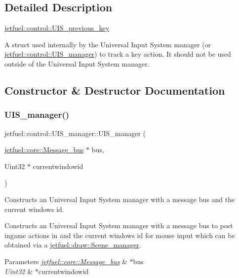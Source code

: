 \subsection{Detailed Description}
\hyperlink{structjetfuel_1_1control_1_1UIS__previous__key}{jetfuel\+::control\+::\+U\+I\+S\+\_\+previous\+\_\+key}

A struct used internally by the Universal Input System manager (or \hyperlink{classjetfuel_1_1control_1_1UIS__manager}{jetfuel\+::control\+::\+U\+I\+S\+\_\+manager}) to track a key action. It should not be used outside of the Universal Input System manager. 

\subsection{Constructor \& Destructor Documentation}
\mbox{\label{classjetfuel_1_1control_1_1UIS__manager_a04d1feda567af305a4495b189ef9bc8f}} 
\subsubsection{\texorpdfstring{U\+I\+S\+\_\+manager()}{UIS\_manager()}}
{\footnotesize\ttfamily jetfuel\+::control\+::\+U\+I\+S\+\_\+manager\+::\+U\+I\+S\+\_\+manager (\begin{DoxyParamCaption}\item[{\hyperlink{classjetfuel_1_1core_1_1Message__bus}{jetfuel\+::core\+::\+Message\+\_\+bus} $\ast$}]{bus,  }\item[{Uint32 $\ast$}]{currentwindowid }\end{DoxyParamCaption})}



Constructs an Universal Input System manager with a message bus and the current window\textquotesingle{}s id. 

Constructs an Universal Input System manager with a message bus to post ingame actions in and the current window\textquotesingle{}s id for mouse input which can be obtained via a \hyperlink{classjetfuel_1_1draw_1_1Scene__manager}{jetfuel\+::draw\+::\+Scene\+\_\+manager}.


\begin{DoxyParams}{Parameters}
{\em \hyperlink{classjetfuel_1_1core_1_1Message__bus}{jetfuel\+::core\+::\+Message\+\_\+bus}} & $\ast$bus \\
\hline
{\em Uint32} & $\ast$currentwindowid \\
\hline
\end{DoxyParams}


